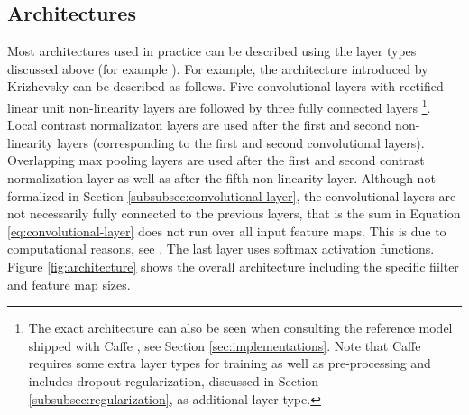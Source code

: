 \subsection{Architectures}
\label{subsec:architectures}

Most architectures used in practice can be described using the layer types discussed above (for example \cite{LeCunBoserDenkerhendersonHowardHubbardJackel:1989,JarrettKavukcuogluRanzatoLeCun:2009}). For example, the architecture introduced by Krizhevsky \etal can be described as follows. Five convolutional layers with rectified linear unit non-linearity layers are followed by three fully connected layers
\footnote{
    The exact architecture can also be seen when consulting the reference model shipped with Caffe \cite{JiaShelhamerDonahueKarayevLongGirshickGuadarramaDarrell:2014}, see Section \ref{sec:implementations}. Note that Caffe requires some extra layer types for training as well as pre-processing and includes dropout regularization, discussed in Section \ref{subsubsec:regularization}, as additional layer type.
}.
Local contrast normalizaton layers are used after the first and second non-linearity layers (corresponding to the first and second convolutional layers). Overlapping max pooling layers are used after the first and second contrast normalization layer as well as after the fifth non-linearity layer. Although not formalized in Section \ref{subsubsec:convolutional-layer}, the convolutional layers are not necessarily fully connected to the previous layers, that is the sum in Equation \eqref{eq:convolutional-layer} does not run over all input feature maps. This is due to computational reasons, see \cite{KrizhevskySutskeverHinton:2012}. The last layer uses softmax activation functions. Figure \ref{fig:architecture} shows the overall architecture including the specific fiilter and feature map sizes.
